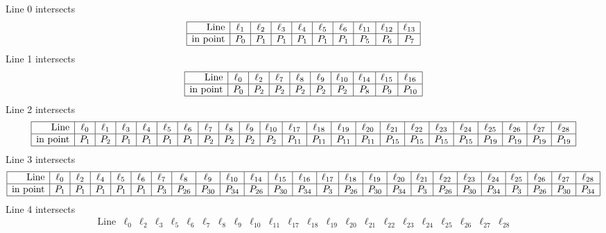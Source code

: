 \documentclass{article}
\begin{document}
{Line 0 intersects 
$$
\begin{array}{|r*{9}{|c}|}
\hline
\mbox{Line}  & \ell_{1} & \ell_{2} & \ell_{3} & \ell_{4} & \ell_{5} & \ell_{6} & \ell_{11} & \ell_{12} & \ell_{13}\\
\hline
\mbox{in point}  & P_{0} & P_{1} & P_{1} & P_{1} & P_{1} & P_{1} & P_{5} & P_{6} & P_{7}\\
\hline
\end{array}
$$
Line 1 intersects 
$$
\begin{array}{|r*{9}{|c}|}
\hline
\mbox{Line}  & \ell_{0} & \ell_{2} & \ell_{7} & \ell_{8} & \ell_{9} & \ell_{10} & \ell_{14} & \ell_{15} & \ell_{16}\\
\hline
\mbox{in point}  & P_{0} & P_{2} & P_{2} & P_{2} & P_{2} & P_{2} & P_{8} & P_{9} & P_{10}\\
\hline
\end{array}
$$
Line 2 intersects 
$$
\begin{array}{|r*{22}{|c}|}
\hline
\mbox{Line}  & \ell_{0} & \ell_{1} & \ell_{3} & \ell_{4} & \ell_{5} & \ell_{6} & \ell_{7} & \ell_{8} & \ell_{9} & \ell_{10} & \ell_{17} & \ell_{18} & \ell_{19} & \ell_{20} & \ell_{21} & \ell_{22} & \ell_{23} & \ell_{24} & \ell_{25} & \ell_{26} & \ell_{27} & \ell_{28}\\
\hline
\mbox{in point}  & P_{1} & P_{2} & P_{1} & P_{1} & P_{1} & P_{1} & P_{2} & P_{2} & P_{2} & P_{2} & P_{11} & P_{11} & P_{11} & P_{11} & P_{15} & P_{15} & P_{15} & P_{15} & P_{19} & P_{19} & P_{19} & P_{19}\\
\hline
\end{array}
$$
Line 3 intersects 
$$
\begin{array}{|r*{24}{|c}|}
\hline
\mbox{Line}  & \ell_{0} & \ell_{2} & \ell_{4} & \ell_{5} & \ell_{6} & \ell_{7} & \ell_{8} & \ell_{9} & \ell_{10} & \ell_{14} & \ell_{15} & \ell_{16} & \ell_{17} & \ell_{18} & \ell_{19} & \ell_{20} & \ell_{21} & \ell_{22} & \ell_{23} & \ell_{24} & \ell_{25} & \ell_{26} & \ell_{27} & \ell_{28}\\
\hline
\mbox{in point}  & P_{1} & P_{1} & P_{1} & P_{1} & P_{1} & P_{3} & P_{26} & P_{30} & P_{34} & P_{26} & P_{30} & P_{34} & P_{3} & P_{26} & P_{30} & P_{34} & P_{3} & P_{26} & P_{30} & P_{34} & P_{3} & P_{26} & P_{30} & P_{34}\\
\hline
\end{array}
$$
Line 4 intersects 
$$
\begin{array}{|r*{22}{|c}|}
\hline
\mbox{Line}  & \ell_{0} & \ell_{2} & \ell_{3} & \ell_{5} & \ell_{6} & \ell_{7} & \ell_{8} & \ell_{9} & \ell_{10} & \ell_{11} & \ell_{17} & \ell_{18} & \ell_{19} & \ell_{20} & \ell_{21} & \ell_{22} & \ell_{23} & \ell_{24} & \ell_{25} & \ell_{26} & \ell_{27} & \ell_{28}\\

\end{array}$$}
\end{document}

